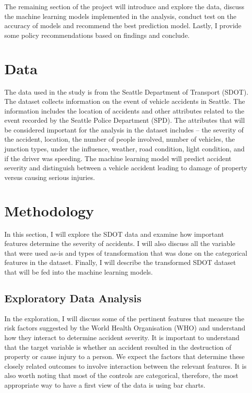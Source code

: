 \documentclass[a4paper,12pt]{article}
\begin{document}
The remaining section of the project will introduce and explore the data, discuss the machine learning models implemented in the analysis, conduct test on the accuracy of models and recommend the best prediction model. Lastly, I provide some policy recommendations based on findings and conclude.

\section{Data}
The data used in the study is from the Seattle Department of Transport (SDOT). The dataset collects information on the event of vehicle accidents in Seattle. The information includes the location of accidents and other attributes related to the event recorded by the Seattle Police Department (SPD). The attributes that will be considered important for the analysis in the dataset includes – the severity of the accident, location, the number of people involved, number of vehicles, the junction types, under the influence, weather, road condition, light condition, and if the driver was speeding. The machine learning model will predict accident severity and distinguish between a vehicle accident leading to damage of property versus causing serious injuries.

\newpage
\section{Methodology}
In this section, I will explore the SDOT data and examine how important features determine the severity of accidents. I will also discuss all the variable that were used as-is and types of transformation that was done on the categorical features in the dataset. Finally, I will describe the transformed SDOT dataset that will be fed into the machine learning models.

\subsection{Exploratory Data Analysis}
In the exploration, I will discuss some of the pertinent features that measure the risk factors suggested by the World Health Organisation (WHO) and understand how they interact to determine accident severity. It is important to understand that the target variable is whether an accident resulted in the destruction of property or cause injury to a person. We expect the factors that determine these closely related outcomes to involve interaction between the relevant features. It is also worth noting that most of the controls are categorical, therefore, the most appropriate way to have a first view of the data is using bar charts.\\
\end{document}
